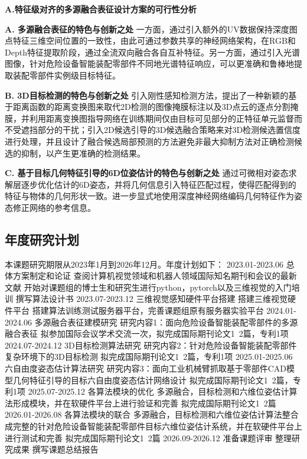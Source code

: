 \documentclass[12pt]{article}
\begin{document}
\textbf{A.特征级对齐的多源融合表征设计方案的可行性分析}



\textbf{A. 多源融合表征的特色与创新之处}
一方面，通过引入额外的UV数据保持深度图点特征三维空间位置的一致性，由此可通过参数共享的神经网络架构，在RGB和Depth特征提取阶段，通过全流双向融合各自互补特征。另一方面，通过引入光谱图像，针对危险设备智能装配零部件不同地光谱特征响应，可以更准确和鲁棒地提取装配零部件实例级目标特征。

\textbf{B. 3D目标检测的特色与创新之处}
引入刚性感知检测方法，提出了一种新颖的基于距离函数的距离变换图来取代2D检测的图像掩膜标注以及3D点云的逐点分割掩膜，并利用距离变换图指导网络在训练期间仅由目标可见部分的正特征单元监督而不受遮挡部分的干扰；引入2D候选引导的3D候选融合策略来对3D检测候选置信度进行处理，并且设计了融合候选局部预测的方法避免非最大抑制方法对正确检测候选的抑制，以产生更准确的检测结果。

\textbf{C. 基于目标几何特征引导的6D位姿估计的特色与创新之处}
通过可微相对姿态求解层逐步优化估计的6D姿态，并将几何信息引入特征匹配过程，使得匹配得到的特征与物体的几何形状一致。进一步显式地使用深度神经网络编码几何特征作为姿态修正网络的参考信息。


\subsection{年度研究计划}

本课题研究期限从2023年1月到2026年12月。年度计划如下：
2023.01-2023.06		总体方案制定和论证
查阅计算机视觉领域和机器人领域国际知名期刊和会议的最新文献
开始对课题组的博士生和研究生进行python，pytorch以及三维视觉的入门培训
撰写算法设计书
2023.07-2023.12		三维视觉感知硬件平台搭建
搭建三维视觉硬件平台
搭建算法训练测试服务器平台，完善课题组原有服务器实验平台
2024.01-2024.06		多源融合表征建模研究
研究内容1：面向危险设备智能装配零部件的多源融合表征
拟参加国际会议学术交流一次，拟完成国际期刊论文1~2篇，专利1项
2024.07-2024.12		3D目标检测算法研究
研究内容2：针对危险设备智能装配零部件复杂环境下的3D目标检测
拟完成国际期刊论文1~2篇，专利1项
2025.01-2025.06		六自由度姿态估计算法研究
研究内容3：面向工业机械臂抓取基于零部件CAD模型几何特征引导的目标六自由度姿态估计网络设计
拟完成国际期刊论文1~2篇，专利1项
2025.07-2025.12		各算法模块的优化
多源融合，目标检测和六维位姿估计算法形成模块，并在软硬件平台上进行验证和完善
拟完成国际期刊论文1~2篇
2026.01-2026.08		各算法模块的联合
多源融合，目标检测和六维位姿估计算法整合成完整的针对危险设备智能装配零部件目标六维位姿估计系统，并在软硬件平台上进行测试和完善
拟完成国际期刊论文1~2篇
2026.09-2026.12		准备课题评审
整理研究成果
撰写课题总结报告
\end{document}
